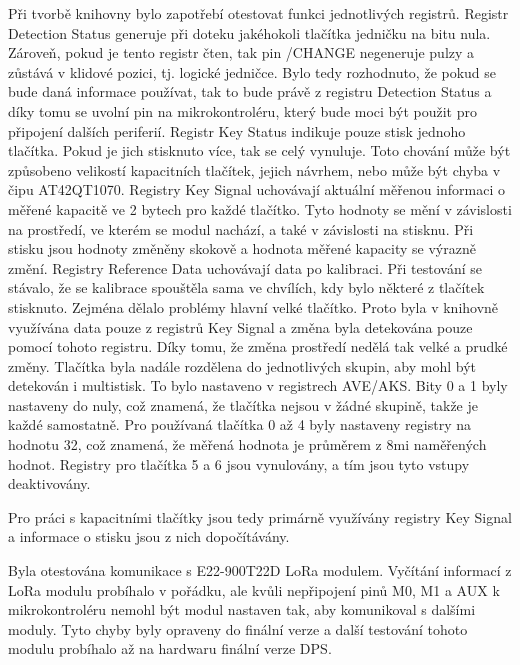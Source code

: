 Při tvorbě knihovny bylo zapotřebí otestovat funkci jednotlivých registrů. Registr Detection Status generuje při doteku jakéhokoli tlačítka jedničku na bitu nula. Zároveň, pokud je tento 
registr čten, tak pin /CHANGE negeneruje pulzy a zůstává v klidové pozici, tj. logické jedničce. Bylo tedy rozhodnuto, že pokud se bude daná informace používat, tak to bude právě z registru 
Detection Status a díky tomu se uvolní pin na mikrokontroléru, který bude moci být použit pro připojení dalších periferií. Registr Key Status indikuje pouze stisk jednoho tlačítka. Pokud 
je jich stisknuto více, tak se celý vynuluje. Toto chování může být způsobeno velikostí kapacitních tlačítek, jejich návrhem, nebo může být chyba v čipu AT42QT1070. Registry Key Signal 
uchovávají aktuální měřenou informaci o měřené kapacitě ve 2 bytech pro každé tlačítko. Tyto hodnoty se mění v závislosti na prostředí, ve kterém se modul nachází, a také v závislosti 
na stisknu. Při stisku jsou hodnoty změněny skokově a hodnota měřené kapacity se výrazně změní. 
Registry Reference Data uchovávají data po kalibraci. Při testování se stávalo, že se kalibrace spouštěla sama ve chvílích, kdy bylo některé z tlačítek stisknuto. Zejména dělalo problémy hlavní
velké tlačítko. Proto byla v knihovně využívána data pouze z registrů Key Signal a změna byla detekována pouze pomocí tohoto registru. Díky tomu, že změna prostředí nedělá tak velké a prudké 
změny. Tlačítka byla nadále rozdělena do jednotlivých skupin, aby mohl být detekován i multistisk. To bylo nastaveno v registrech AVE/AKS. Bity 0 a 1 byly nastaveny do nuly, což znamená, že 
tlačítka nejsou v žádné skupině, takže je každé samostatně. Pro používaná tlačítka 0 až 4 byly nastaveny registry na hodnotu 32, což znamená, že měřená hodnota je průměrem z 8mi naměřených
hodnot. Registry pro tlačítka 5 a 6 jsou vynulovány, a tím jsou tyto vstupy deaktivovány. 

Pro práci s kapacitními tlačítky jsou tedy primárně využívány registry Key Signal a informace o stisku jsou z nich dopočítávány. 

Byla otestována komunikace s E22-900T22D LoRa modulem. Vyčítání informací z LoRa modulu probíhalo v pořádku, ale kvůli nepřipojení pinů M0, M1 a AUX k mikrokontroléru nemohl být modul nastaven
tak, aby komunikoval s dalšími moduly. Tyto chyby byly opraveny do finální verze a další testování tohoto modulu probíhalo až na hardwaru finální verze DPS. 

